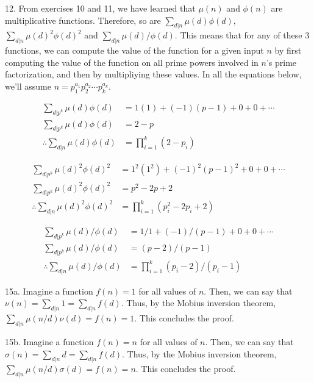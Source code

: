 \documentclass{article}
\begin{document}
12. From exercises 10 and 11, we have learned that $\mu(n)$ and $\phi(n)$ are multiplicative functions. Therefore, so are $\sum_{d | n} \mu(d) \phi(d)$, $\sum_{d | n} \mu(d)^2 \phi(d)^2$ and $\sum_{d | n} \mu(d) / \phi(d)$. This means that for any of these 3 functions, we can compute the value of the function for a given input $n$ by first computing the value of the function on all prime powers involved in $n$'s prime factorization, and then by multipliying these values. In all the equations below, we'll assume $n = p_1^{a_1} p_2^{a_2} \cdots p_k^{a_k}$.

\begin{align*}
    \sum_{d | p^k} \mu(d) \phi(d) &=  1(1) + (-1)(p - 1) + 0 + 0 + \cdots \\
    \sum_{d | p^k} \mu(d) \phi(d) &=  2 - p \\
    \therefore \sum_{d | n} \mu(d) \phi(d) &= \prod_{i = 1}^k (2 - p_i)
\end{align*}

\begin{align*}
    \sum_{d | p^k} \mu(d)^2 \phi(d)^2 &=  1^2(1^2) + (-1)^2(p - 1)^2 + 0 + 0 + \cdots \\
    \sum_{d | p^k} \mu(d)^2 \phi(d)^2 &=  p^2 - 2p + 2 \\
    \therefore \sum_{d | n} \mu(d)^2 \phi(d)^2 &= \prod_{i = 1}^k (p_i^2 -2p_i + 2)
\end{align*}

\begin{align*}
    \sum_{d | p^k} \mu(d) / \phi(d) &=  1 / 1 + (-1) / (p - 1) + 0 + 0 + \cdots \\
    \sum_{d | p^k} \mu(d) / \phi(d) &=  (p - 2) / (p - 1) \\
    \therefore \sum_{d | n} \mu(d) / \phi(d) &= \prod_{i = 1}^k (p_i - 2) / (p_i - 1)
\end{align*}

15a. Imagine a function $f(n) = 1$ for all values of $n$. Then, we can say that $\nu(n) = \sum_{d | n} 1 = \sum_{d | n} f(d)$. Thus, by the Mobius inversion theorem, $\sum_{d | n} \mu(n/d)\nu(d) = f(n) = 1$. This concludes the proof. 

15b. Imagine a function $f(n) = n$ for all values of $n$. Then, we can say that $\sigma(n) = \sum_{d | n} d = \sum_{d | n} f(d)$. Thus, by the Mobius inversion theorem, $\sum_{d | n} \mu(n/d)\sigma(d) = f(n) = n$. This concludes the proof.
\end{document}
